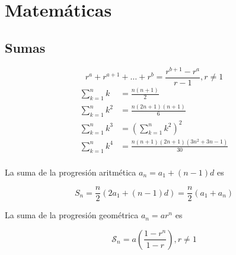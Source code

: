 
\newtheorem*{teo}{\emph{$T^a$}}
\newtheorem*{prop}{Prop}

\chapter{Matemáticas}

\section{Sumas}
\[ r^a + r^{a+1} + \dots + r^{b} = \frac{r^{b+1} - r^a}{r - 1}, r \neq 1 \]
\begin{align*}
	\sum_{k = 1}^{n} k &= \frac{n(n+1)}{2} \\
	\sum_{k = 1}^{n} k^2 &= \frac{n(2n+1)(n+1)}{6} \\
	\sum_{k = 1}^{n} k^3 &= \left( \sum_{k = 1}^{n} k^2 \right) ^2 \\
	\sum_{k = 1}^{n} k^4 &= \frac{n(n+1)(2n+1)(3n^2 + 3n - 1)}{30} \\
\end{align*}

La suma de la progresión aritmética $a_n = a_1 + (n - 1)d$ es

\[ S_n = \frac{n}{2} (2 a_1 + (n - 1)d) = \frac{n}{2}(a_1 + a_n) \]

La suma de la progresión geométrica $a_n = ar^n$ es

\[ \mathcal{S}_n = a \left( \frac{1 - r^n}{1 - r} \right), r \neq 1 \]

